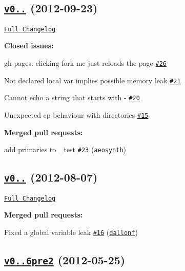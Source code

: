 \subsection*{\href{https://github.com/shelljs/shelljs/tree/v0.0.7}{\tt v0..} (2012-\/09-\/23)}

\href{https://github.com/shelljs/shelljs/compare/v0.0.6...v0.0.7}{\tt Full Changelog}

{\bfseries Closed issues\+:}


\begin{DoxyItemize}
\item gh-\/pages\+: clicking \textquotesingle{}fork me\textquotesingle{} just reloads the page \href{https://github.com/shelljs/shelljs/issues/26}{\tt \#26}
\item Not declared local var implies possible memory leak \href{https://github.com/shelljs/shelljs/issues/21}{\tt \#21}
\item Cannot echo a string that starts with -\/ \href{https://github.com/shelljs/shelljs/issues/20}{\tt \#20}
\item Unexpected cp behaviour with directories \href{https://github.com/shelljs/shelljs/issues/15}{\tt \#15}
\end{DoxyItemize}

{\bfseries Merged pull requests\+:}


\begin{DoxyItemize}
\item add primaries to \+\_\+test \href{https://github.com/shelljs/shelljs/pull/23}{\tt \#23} (\href{https://github.com/aeosynth}{\tt aeosynth})
\end{DoxyItemize}

\subsection*{\href{https://github.com/shelljs/shelljs/tree/v0.0.6}{\tt v0..} (2012-\/08-\/07)}

\href{https://github.com/shelljs/shelljs/compare/v0.0.6pre2...v0.0.6}{\tt Full Changelog}

{\bfseries Merged pull requests\+:}


\begin{DoxyItemize}
\item Fixed a global variable leak \href{https://github.com/shelljs/shelljs/pull/16}{\tt \#16} (\href{https://github.com/dallonf}{\tt dallonf})
\end{DoxyItemize}

\subsection*{\href{https://github.com/shelljs/shelljs/tree/v0.0.6pre2}{\tt v0..\+6pre2} (2012-\/05-\/25)}

